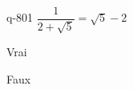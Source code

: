 \begin{truefalse}{q-801}
$\dfrac{1}{2+\sqrt{5}} = \sqrt{5} - 2$
\item* Vrai
\item Faux
\end{truefalse}

